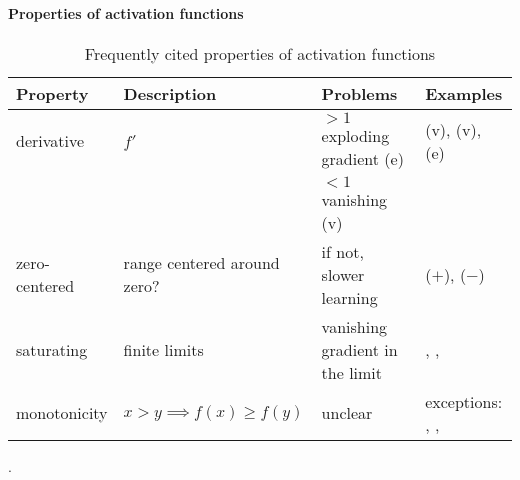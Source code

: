\paragraph{Properties of activation functions} 
\begin{table*}[!htb]
\centering
\footnotesize
\begin{tabular}{llll}
  \toprule
  Property & Description & Problems & Examples \\ \midrule
  derivative & $f'$ & $>1$ exploding gradient (e) &  \sigmoid{} (v), \mytanh{} (v), \cube{} (e)\\
  & & $<1$ vanishing (v) & \\
  zero-centered & range centered around zero? &   if not, slower learning & \mytanh{} ($+$), \relu{} ($-$) \\ 
  saturating & finite limits & vanishing gradient in the limit & \mytanh{}, \pentan{}, \sigmoid{}\\
  monotonicity & $x>y\implies f(x)\ge f(y)$ & unclear & exceptions: \mysin{}, \swish{}, \minsin{} 
  \\ \bottomrule
 \end{tabular}
 \caption{Frequently cited properties of activation functions}.
 \label{table:properties}
\end{table*}

